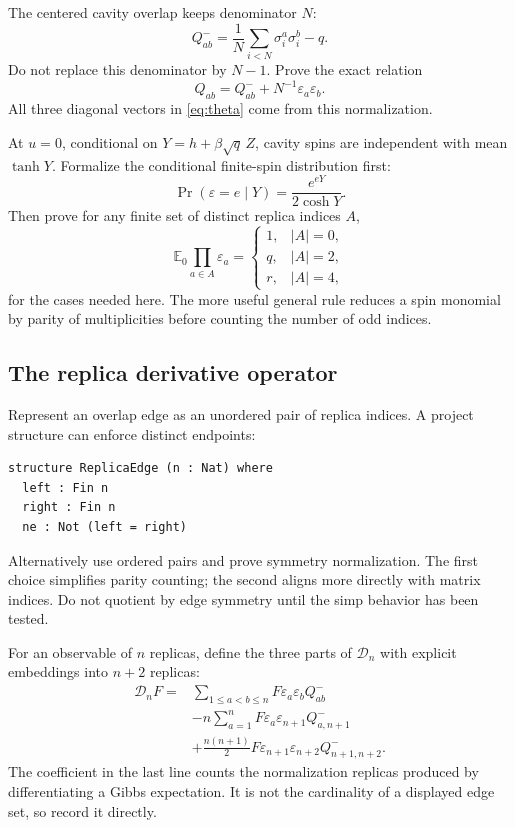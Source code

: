 \documentclass[11pt]{article}
\numberwithin{equation}{section}
\newcommand{\E}{\mathbb{E}}
\newcommand{\1}{\mathbf 1}
\begin{document}
The centered cavity overlap keeps denominator $N$:
\[
 Q^-_{ab}=\frac1N\sum_{i<N}\sigma_i^a\sigma_i^b-q.
\]
Do not replace this denominator by $N-1$.  Prove the exact relation
\[
 Q_{ab}=Q^-_{ab}+N^{-1}\varepsilon_a\varepsilon_b.
\]
All three diagonal vectors in \eqref{eq:theta} come from this normalization.

At $u=0$, conditional on
$Y=h+\beta\sqrt q\,Z$, cavity spins are independent with mean $\tanh Y$.
Formalize the conditional finite-spin distribution first:
\[
 \Pr(\varepsilon=e\mid Y)
 =\frac{e^{eY}}{2\cosh Y}.
\]
Then prove for any finite set of distinct replica indices $A$,
\[
 \E_0\prod_{a\in A}\varepsilon_a
 =
 \begin{cases}
 1,&|A|=0,\\
 q,&|A|=2,\\
 r,&|A|=4,
 \end{cases}
\]
for the cases needed here.  The more useful general rule reduces a spin
monomial by parity of multiplicities before counting the number of odd
indices.

\subsection{The replica derivative operator}

Represent an overlap edge as an unordered pair of replica indices.  A
project structure can enforce distinct endpoints:
\begin{lstlisting}
structure ReplicaEdge (n : Nat) where
  left : Fin n
  right : Fin n
  ne : Not (left = right)
\end{lstlisting}
Alternatively use ordered pairs and prove symmetry normalization.  The first
choice simplifies parity counting; the second aligns more directly with
matrix indices.  Do not quotient by edge symmetry until the simp behavior
has been tested.

For an observable of $n$ replicas, define the three parts of
$\mathcal D_n$ with explicit embeddings into $n+2$ replicas:
\begin{align*}
\mathcal D_nF={}&
 \sum_{1\le a<b\le n}F\varepsilon_a\varepsilon_bQ^-_{ab}\\
&-n\sum_{a=1}^n
 F\varepsilon_a\varepsilon_{n+1}Q^-_{a,n+1}\\
&+\frac{n(n+1)}2
 F\varepsilon_{n+1}\varepsilon_{n+2}Q^-_{n+1,n+2}.
\end{align*}
The coefficient in the last line counts the normalization replicas produced
by differentiating a Gibbs expectation.  It is not the cardinality of a
displayed edge set, so record it directly.
\end{document}
